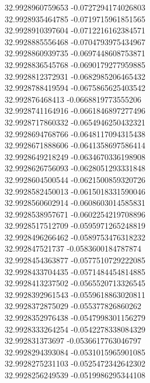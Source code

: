 {32.9928960759653	-0.0727294174026803\\
32.9928935464785	-0.0719715961851565\\
32.9928910397604	-0.0712216162384571\\
32.9928885556468	-0.0704793975434967\\
32.9928860939735	-0.0697448608753871\\
32.9928836545768	-0.0690179277959885\\
32.9928812372931	-0.0682985206465432\\
32.9928788419594	-0.0675865625403542\\
32.992876468413	-0.0668819773555206\\
32.9928741164916	-0.0661846897277496\\
32.9928717860332	-0.0654946250432321\\
32.9928694768766	-0.0648117094315438\\
32.9928671888606	-0.0641358697586414\\
32.9928649218249	-0.0634670336198908\\
32.9928626756093	-0.0628051293331848\\
32.9928604500544	-0.0621500859320726\\
32.9928582450013	-0.0615018331590046\\
32.9928560602914	-0.0608603014585831\\
32.9928538957671	-0.0602254219708896\\
32.9928517512709	-0.0595971265248819\\
32.9928496266462	-0.0589753476318232\\
32.992847521737	-0.0583600184787874\\
32.9928454363877	-0.0577510729222085\\
32.9928433704435	-0.0571484454814885\\
32.9928413237502	-0.0565520713326545\\
32.9928392961543	-0.0559618863020811\\
32.9928372875029	-0.055377826860262\\
32.9928352976438	-0.0547998301156279\\
32.9928333264254	-0.0542278338084329\\
32.992831373697	-0.0536617763046797\\
32.9928294393084	-0.0531015965901085\\
32.9928275231103	-0.0525472342642302\\
32.9928256249539	-0.0519986295344108\\
}
